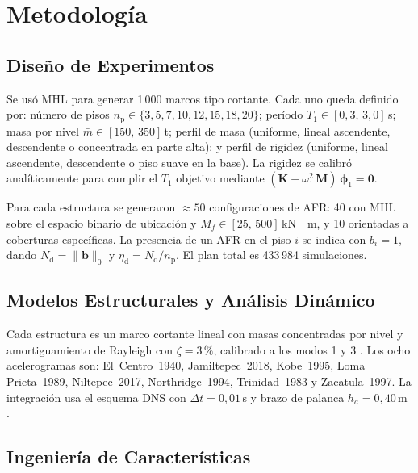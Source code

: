\documentclass[preprint,12pt,authoryear]{elsarticle}
\newcommand{\nd}{N_{\mathrm{d}}}
\newcommand{\np}{n_{\mathrm{p}}}
\newcommand{\etad}{\eta_{\mathrm{d}}}
\newcommand{\Mf}{M_{\!f}}
\newcommand{\ha}{h_a}
\newcommand{\KM}{\,\si{kN{\cdot}m}}
\begin{document}
\section{Metodología}
\label{sec:method}

\subsection{Diseño de Experimentos}
\label{sec:method:doe}

Se usó MHL \citep{McKay1979} para generar 1\,000 marcos tipo cortante. Cada uno
queda definido por: número de pisos $\np \in \{3, 5, 7, 10, 12, 15, 18, 20\}$;
período $T_1 \in [0{,}3,\,3{,}0]$\,s; masa por nivel $\bar{m} \in [150,\,350]$\,t;
perfil de masa (uniforme, lineal ascendente, descendente o concentrada en parte
alta); y perfil de rigidez (uniforme, lineal ascendente, descendente o piso
suave en la base). La rigidez se calibró analíticamente para cumplir el $T_1$
objetivo mediante $(\bm{K} - \omega_1^2\,\bm{M})\,\bm{\phi}_1 = \bm{0}$.

Para cada estructura se generaron $\approx 50$ configuraciones de AFR: 40 con
MHL sobre el espacio binario de ubicación y $\Mf \in [25,\,500]$\KM, y 10
orientadas a coberturas específicas. La presencia de un AFR en el piso $i$ se
indica con $b_i = 1$, dando $\nd = \|\bm{b}\|_0$ y $\etad = \nd/\np$. El plan
total es 433\,984 simulaciones.

\subsection{Modelos Estructurales y Análisis Dinámico}
\label{sec:method:modelo}

Cada estructura es un marco cortante lineal con masas concentradas por nivel y
amortiguamiento de Rayleigh con $\zeta = 3\,\text{\%}$, calibrado a los modos
1 y 3 \citep{chopra_dynamics_2015}. Los ocho acelerogramas son: El~Centro~1940,
Jamiltepec~2018, Kobe~1995, Loma Prieta~1989, Niltepec~2017, Northridge~1994,
Trinidad~1983 y Zacatula~1997. La integración usa el esquema DNS con
$\Delta t = 0{,}01$\,s y brazo de palanca $\ha = 0{,}40$\,m
\citep{Mualla2002, Jarrahi2020jbe}.

\subsection{Ingeniería de Características}
\label{sec:method:features}
\end{document}
